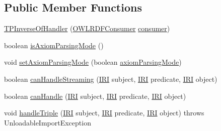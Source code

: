 \subsection*{Public Member Functions}
\begin{DoxyCompactItemize}
\item 
\hyperlink{classorg_1_1coode_1_1owlapi_1_1rdfxml_1_1parser_1_1_t_p_inverse_of_handler_a3b07172431d86e929925088fe1b289a6}{T\-P\-Inverse\-Of\-Handler} (\hyperlink{classorg_1_1coode_1_1owlapi_1_1rdfxml_1_1parser_1_1_o_w_l_r_d_f_consumer}{O\-W\-L\-R\-D\-F\-Consumer} \hyperlink{classorg_1_1coode_1_1owlapi_1_1rdfxml_1_1parser_1_1_abstract_triple_handler_a4ccf4d898ff01eb1cadfa04b23d54e9c}{consumer})
\item 
boolean \hyperlink{classorg_1_1coode_1_1owlapi_1_1rdfxml_1_1parser_1_1_t_p_inverse_of_handler_ae2f9591560813ab07e85db55978b4017}{is\-Axiom\-Parsing\-Mode} ()
\item 
void \hyperlink{classorg_1_1coode_1_1owlapi_1_1rdfxml_1_1parser_1_1_t_p_inverse_of_handler_a04aa9b2b6d9e7187978f93006687a564}{set\-Axiom\-Parsing\-Mode} (boolean \hyperlink{classorg_1_1coode_1_1owlapi_1_1rdfxml_1_1parser_1_1_t_p_inverse_of_handler_a59ef1a5cbc6655336de1f8d2bd1d324d}{axiom\-Parsing\-Mode})
\item 
boolean \hyperlink{classorg_1_1coode_1_1owlapi_1_1rdfxml_1_1parser_1_1_t_p_inverse_of_handler_aa3d27cfb201fcff12f068cf070a0f3cc}{can\-Handle\-Streaming} (\hyperlink{classorg_1_1semanticweb_1_1owlapi_1_1model_1_1_i_r_i}{I\-R\-I} subject, \hyperlink{classorg_1_1semanticweb_1_1owlapi_1_1model_1_1_i_r_i}{I\-R\-I} predicate, \hyperlink{classorg_1_1semanticweb_1_1owlapi_1_1model_1_1_i_r_i}{I\-R\-I} object)
\item 
boolean \hyperlink{classorg_1_1coode_1_1owlapi_1_1rdfxml_1_1parser_1_1_t_p_inverse_of_handler_a08d385cb60a7e464d5d46f54ff8d29bf}{can\-Handle} (\hyperlink{classorg_1_1semanticweb_1_1owlapi_1_1model_1_1_i_r_i}{I\-R\-I} subject, \hyperlink{classorg_1_1semanticweb_1_1owlapi_1_1model_1_1_i_r_i}{I\-R\-I} predicate, \hyperlink{classorg_1_1semanticweb_1_1owlapi_1_1model_1_1_i_r_i}{I\-R\-I} object)
\item 
void \hyperlink{classorg_1_1coode_1_1owlapi_1_1rdfxml_1_1parser_1_1_t_p_inverse_of_handler_a5bd5c2a1c254cec8bf19d56c8e6d05ea}{handle\-Triple} (\hyperlink{classorg_1_1semanticweb_1_1owlapi_1_1model_1_1_i_r_i}{I\-R\-I} subject, \hyperlink{classorg_1_1semanticweb_1_1owlapi_1_1model_1_1_i_r_i}{I\-R\-I} predicate, \hyperlink{classorg_1_1semanticweb_1_1owlapi_1_1model_1_1_i_r_i}{I\-R\-I} object)  throws Unloadable\-Import\-Exception 
\end{DoxyCompactItemize}
